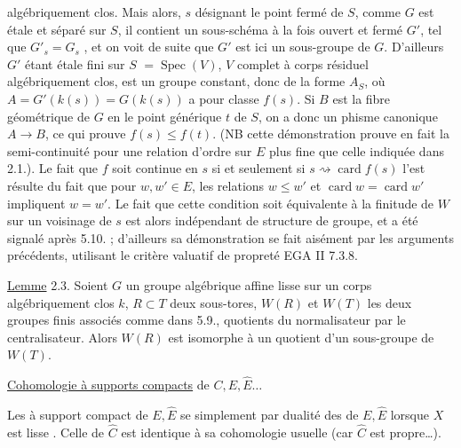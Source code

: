 algébriquement clos. Mais alors, $s$ désignant le point fermé de $S$, comme $G$ est étale et séparé sur $S$, il contient un sous-schéma à la fois ouvert et fermé $G'$,  tel que $G'_s=G_s$ , et on voit de suite que $G'$ est ici un sous-groupe de $G$.  D'ailleurs $G'$  étant étale fini sur $S$  $=\operatorname{Spec}(V)$, $V$ complet à corps résiduel algébriquement clos, est un groupe constant, donc de la forme $A_S$, où $A=G'(k(s))=G(k(s))$ a pour classe $f(s)$.  Si $B$ est la fibre géométrique de $G$ en le point générique $t$ de $S$, on a donc un phisme canonique $A\longrightarrow B$, ce qui prouve $f(s)\leq f(t)$. (NB cette démonstration prouve en fait la semi-continuité pour une relation d'ordre sur $E$ plus fine que celle indiquée dans 2.1.). Le fait que $f$ soit continue en $s$ si et seulement si $s\rightsquigarrow\operatorname{card}f(s)$ l'est résulte du fait que pour $w,w'\in E$, les relations  $w\leq w'$ et $\operatorname{card}w=\operatorname{card}w'$ impliquent $w=w'$. Le fait que cette condition soit équivalente à  la finitude de $W$ sur un voisinage de $s$ est alors indépendant de structure de groupe, et a été signalé après  5.10. ; d'ailleurs sa démonstration  se fait aisément par les arguments précédents,  utilisant le critère valuatif de propreté EGA II 7.3.8.

\uline{Lemme} 2.3. Soient $G$ un groupe algébrique affine lisse sur un corps algébriquement clos $k$, $R\subset T$ deux sous-tores, $W(R)$ et $W(T)$ les deux groupes finis associés comme dans  5.9., quotients du normalisateur par le centralisateur. Alors $W(R)$ est isomorphe à un quotient d'un sous-groupe de $W(T)$.



\uline{Cohomologie à supports compacts}  de $C,E,\widehat E\ldots$

Les  à support compact de $E,\widehat E$ se  simplement par dualité des  de $E,\widehat E$ lorsque $X$ est lisse \unsure{\ldots\ (\ldots}. Celle de $\widehat C$ est identique à sa cohomologie usuelle (car $\widehat C$ est propre\ldots).

